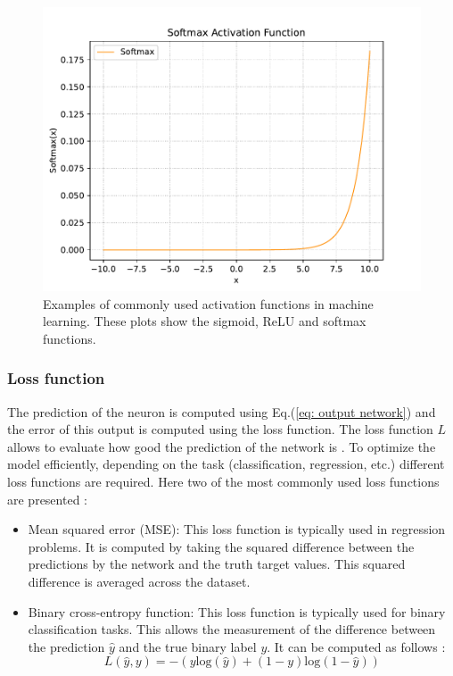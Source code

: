 \begin{figure}[h]
\begin{minipage}[b]{0.3\textwidth}
        \centering
        \includegraphics[width=1.2\linewidth]{Images/5.SPANet/Softmax.pdf}
    \end{minipage}
    \caption{Examples of commonly used activation functions in machine learning. These plots show the sigmoid, ReLU and softmax functions.}
    \label{fig: activation function}
\end{figure}

\subsubsection{Loss function}

The prediction of the neuron is computed using Eq.(\ref{eq: output network}) and the error of this output is computed using the loss function. The loss function $L$  allows to evaluate how good the prediction of the network is \cite{loss_function}. To optimize the model efficiently, depending on the task (classification, regression, etc.) different loss functions are required. Here two of the most commonly used loss functions are presented \cite{TesiMatteo}:

\begin{itemize}
    \item Mean squared error (MSE): This loss function is typically used in regression problems. It is computed by taking the squared difference between the predictions by the network and the truth target values. This squared difference is averaged across the dataset.
    \item Binary cross-entropy function: This loss function is typically used for binary classification tasks. This allows the measurement of the difference between the prediction $\hat{y}$ and the true binary label $y$. It can be computed as follows \cite{neutrinoslides}:
    \begin{equation}
        L(\hat{y},y)=-(y \text{log}(\hat{y}) + (1-y)  \text{log}(1-\hat{y}))    \end{equation}
\end{itemize} 

